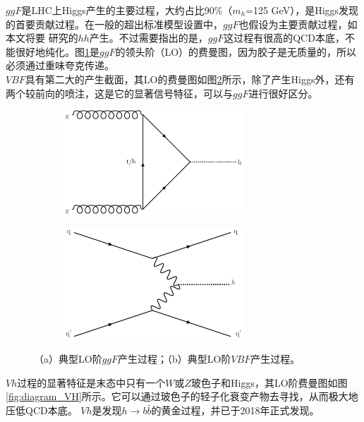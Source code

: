 $ggF$是LHC上Higgs产生的主要过程，大约占比90\%（$m_h$=125 GeV），是Higgs发现的首要贡献过程。在一般的超出标准模型设置中，$ggF$也假设为主要贡献过程，如本文将要
研究的$hh$产生。不过需要指出的是，$ggF$这过程有很高的QCD本底，不能很好地纯化。图\ref{fig:diagram_ggF}是$ggF$的领头阶（LO）的费曼图，因为胶子是无质量的，所以必须通过重味夸克传递。\\
$VBF$具有第二大的产生截面，其LO的费曼图如图\ref{fig:diagram_VBF}所示，除了产生Higgs外，还有两个较前向的喷注，这是它的显著信号特征，可以与$ggF$进行很好区分。
\begin{figure}[h]
\centering
 \begin{subfigure}[b]{0.45\textwidth}
  \includegraphics[width=0.75\textwidth]{fig/ggF.pdf}
  \caption{}
  \label{fig:diagram_ggF}
 \end{subfigure}
 \begin{subfigure}[b]{0.45\textwidth}
  \includegraphics[width=0.75\textwidth]{fig/VBF.pdf}
  \caption{}
  \label{fig:diagram_VBF}
 \end{subfigure}
\caption{（a）典型LO阶$ggF$产生过程；（b）典型LO阶$VBF$产生过程。}
\label{fig:ggF_VBF}
\end{figure}
$Vh$过程的显著特征是末态中只有一个$W$或$Z$玻色子和Higgs，其LO阶费曼图如图\ref{fig:diagram_VH}所示。它可以通过玻色子的轻子化衰变产物去寻找，从而极大地压低QCD本底。
$Vh$是发现$h\rightarrow b\bar{b}$的黄金过程，并已于2018年正式发现\cite{Aaboud:2018zhk,Sirunyan:2018kst}。
